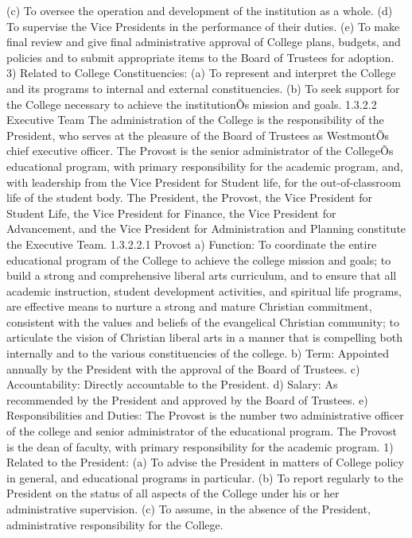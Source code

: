 \documentclass[letterpaper, 11pt]{article}
\begin{document}
(c) To oversee the operation and development of the institution as a whole.
(d) To supervise the Vice Presidents in the performance of their duties.
(e) To make final review and give final administrative approval of College plans, budgets, and policies and to submit appropriate items to the Board of Trustees for adoption.
3) Related to College Constituencies:
(a) To represent and interpret the College and its programs to internal and external constituencies.
(b) To seek support for the College necessary to achieve the institutionÕs mission and goals.
1.3.2.2 Executive Team
   The administration of the College is the responsibility of the President, who serves at the pleasure of the Board of Trustees as WestmontÕs chief executive officer.  The Provost is the senior administrator of the CollegeÕs educational program, with primary responsibility for the academic program, and, with leadership from the Vice President for Student life, for the out-of-classroom life of the student body.  The President, the Provost, the Vice President for Student Life, the Vice President for Finance, the Vice President for Advancement, and the Vice President for Administration and Planning constitute the Executive Team.
1.3.2.2.1 Provost
a) Function:  To coordinate the entire educational program of the College to achieve the college mission and goals; to build a strong and comprehensive liberal arts curriculum, and to ensure that all academic instruction, student development activities, and spiritual life programs, are effective means to nurture a strong and mature Christian commitment, consistent with the values and beliefs of the evangelical Christian community; to articulate the vision of Christian liberal arts in a manner that is compelling both internally and to the various constituencies of the college.
b) Term:  Appointed annually by the President with the approval of the Board of Trustees.
c) Accountability:  Directly accountable to the President.
d) Salary:  As recommended by the President and approved by the Board of Trustees.
e) Responsibilities and Duties:  The Provost is the number two administrative officer of the college and senior administrator of the educational program.  The Provost is the dean of faculty, with primary responsibility for the academic program.
1) Related to the President:
(a) To advise the President in matters of College policy in general, and educational programs in particular.
(b) To report regularly to the President on the status of all aspects of the College under his or her administrative supervision.
(c) To assume, in the absence of the President, administrative responsibility for the College.
\end{document}
